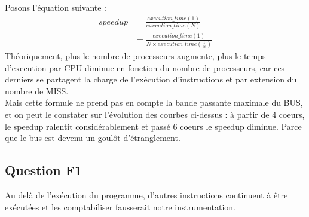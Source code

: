 \documentclass[10pt]{article}
\begin{document}
Posons l'équation suivante :
\begin{equation}
  \begin{split}
    speedup & =\frac{execution\_time(1)}{execution\_time(N)} \\
     & =\frac{execution\_time(1)}{N \times execution\_time(\frac{1}{N})}
  \end{split}
\end{equation}
Théoriquement, plus le nombre de processeurs augmente, plus le temps d'execution
par CPU diminue en fonction du nombre de processeurs, car ces derniers se partagent
la charge de l'exécution d'instructions et par extension du nombre de MISS.\\
Mais cette formule ne prend pas en compte la bande passante maximale du BUS, et
on peut le constater sur l'évolution des courbes ci-dessus : à partir de 4 coeurs,
le speedup ralentit considérablement et passé 6 coeurs le speedup diminue. Parce
que le bus est devenu un goulôt d'étranglement.

\newpage

\subsection{Question F1}
Au delà de l'exécution du programme, d'autres instructions continuent à être
exécutées et les comptabiliser fausserait notre instrumentation.
\end{document}
